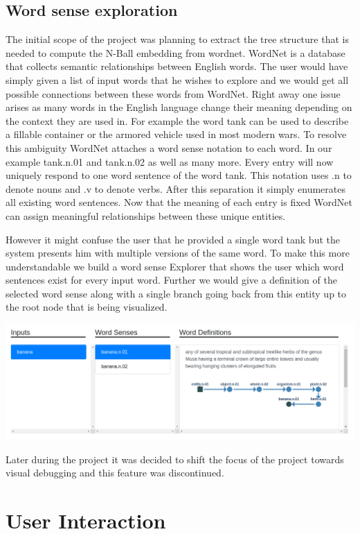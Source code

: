 \documentclass[]{article}
\begin{document}
\subsection{Word sense exploration}
The initial scope of the project was planning to extract the tree structure that is needed to compute the N-Ball embedding from wordnet. WordNet is a database that collects semantic relationships between English words. The user would have simply given a list of input words that he wishes to explore and we would get all possible connections between these words from WordNet. 
Right away one issue arises as many words in the English language change their meaning depending on the context they are used in. For example the word tank can be used to describe a fillable container or the armored vehicle used in most modern wars. To resolve this ambiguity WordNet attaches a word sense notation to each word. In our example tank.n.01 and tank.n.02 as well as many more. Every entry will now uniquely respond to one word sentence of the word tank. This notation uses .n to denote nouns and .v to denote verbs. After this separation it simply enumerates all existing word sentences. Now that the meaning of each entry is fixed WordNet can assign meaningful relationships between these unique entities. 

However it might confuse the user that he provided a single word tank but the system presents him with multiple versions of the same word. To make this more understandable we build a word sense Explorer that shows the user which word sentences exist for every input word. Further we would give a definition of the selected word sense along with a single branch going back from this entity up to the root node that is being visualized.

\includegraphics[width=\textwidth]{res/word-sense.png}

Later during the project it was decided to shift the focus of the project towards visual debugging and this feature was discontinued.

\section{User Interaction}
\end{document}

